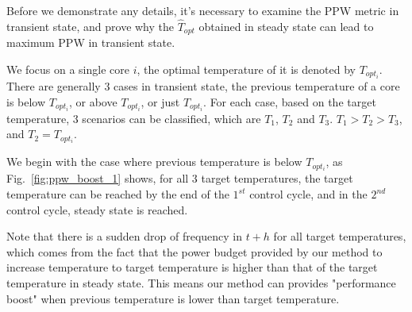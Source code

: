 Before we demonstrate any details, it's necessary to examine the PPW metric in transient state, and prove why the $\hat{T}_{opt}$ obtained in steady state can lead to maximum PPW in transient state.

We focus on a single core $i$, the optimal temperature of it is denoted by $T_{opt_{i}}$. There are generally $3$ cases in transient state, the previous temperature of a core is below $T_{opt_{i}}$, or above $T_{opt_{i}}$, or just $T_{opt_{i}}$. For each case, based on the target temperature, $3$ scenarios can be classified, which are $T_{1}$, $T_{2}$ and $T_{3}$. $T_{1}>T_{2}>T_{3}$, and $T_{2} = T_{opt_{i}}$.


We begin with the case where previous temperature is below $T_{opt_{i}}$, as Fig.~\ref{fig:ppw_boost_1} shows, for all $3$ target temperatures, the target temperature can be reached by the end of the $1^{st}$ control cycle, and in the $2^{nd}$ control cycle, steady state is reached.

Note that there is a sudden drop of frequency in $t+h$ for all target temperatures, which comes from the fact that the power budget provided by our method to increase temperature to target temperature is higher than that of the target temperature in steady state. This means our method can provides "performance boost" when previous temperature is lower than target temperature.

